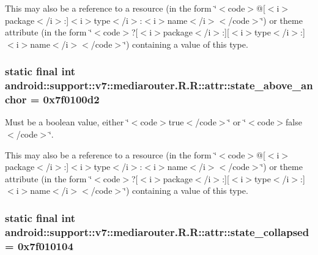 This may also be a reference to a resource (in the form \char`\"{}$<$code$>$@\mbox{[}$<$i$>$package$<$/i$>$:\mbox{]}$<$i$>$type$<$/i$>$:$<$i$>$name$<$/i$>$$<$/code$>$\char`\"{}) or theme attribute (in the form \char`\"{}$<$code$>$?\mbox{[}$<$i$>$package$<$/i$>$:\mbox{]}\mbox{[}$<$i$>$type$<$/i$>$:\mbox{]}$<$i$>$name$<$/i$>$$<$/code$>$\char`\"{}) containing a value of this type. \hypertarget{classandroid_1_1support_1_1v7_1_1mediarouter_1_1_r_1_1attr_f9d7abb22d2bcae138fe42b84b39f121}{
\subsubsection[{state\_\-above\_\-anchor}]{\setlength{\rightskip}{0pt plus 5cm}static final int android::support::v7::mediarouter.R.R::attr::state\_\-above\_\-anchor = 0x7f0100d2}}
\label{classandroid_1_1support_1_1v7_1_1mediarouter_1_1_r_1_1attr_f9d7abb22d2bcae138fe42b84b39f121}


Must be a boolean value, either \char`\"{}$<$code$>$true$<$/code$>$\char`\"{} or \char`\"{}$<$code$>$false$<$/code$>$\char`\"{}. 

This may also be a reference to a resource (in the form \char`\"{}$<$code$>$@\mbox{[}$<$i$>$package$<$/i$>$:\mbox{]}$<$i$>$type$<$/i$>$:$<$i$>$name$<$/i$>$$<$/code$>$\char`\"{}) or theme attribute (in the form \char`\"{}$<$code$>$?\mbox{[}$<$i$>$package$<$/i$>$:\mbox{]}\mbox{[}$<$i$>$type$<$/i$>$:\mbox{]}$<$i$>$name$<$/i$>$$<$/code$>$\char`\"{}) containing a value of this type. \hypertarget{classandroid_1_1support_1_1v7_1_1mediarouter_1_1_r_1_1attr_12c7c10db54862d00021d68e01f3c39f}{
\subsubsection[{state\_\-collapsed}]{\setlength{\rightskip}{0pt plus 5cm}static final int android::support::v7::mediarouter.R.R::attr::state\_\-collapsed = 0x7f010104}}
\label{classandroid_1_1support_1_1v7_1_1mediarouter_1_1_r_1_1attr_12c7c10db54862d00021d68e01f3c39f}



